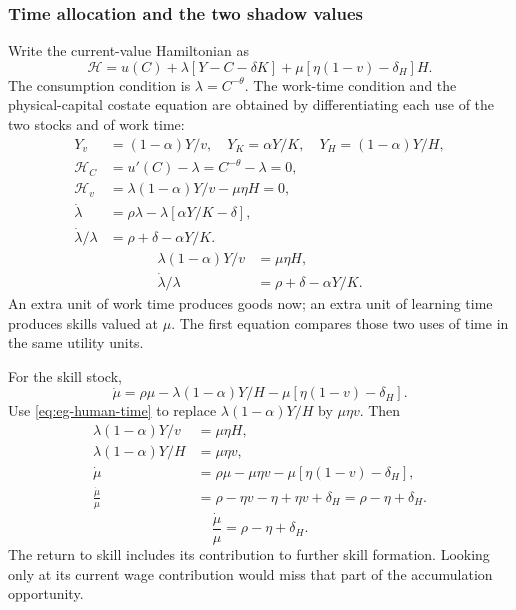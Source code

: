 \subsubsection{Time allocation and the two shadow values}

Write the current-value Hamiltonian as
\begin{equation}
\mathcal H=u(C)+\lambda[Y-C-\delta K]
 +\mu[\eta(1-v)-\delta_H]H.
\end{equation}
The consumption condition is $\lambda=C^{-\theta}$. The work-time condition
and the physical-capital costate equation are
obtained by differentiating each use of the two stocks and of work time:
\begin{align}
Y_v&=(1-\alpha)Y/v,\quad Y_K=\alpha Y/K,\quad
Y_H=(1-\alpha)Y/H,\\
\mathcal H_C&=u'(C)-\lambda=C^{-\theta}-\lambda=0,\\
\mathcal H_v&=\lambda(1-\alpha)Y/v-\mu\eta H=0,\\
\dot\lambda&=\rho\lambda-\lambda[\alpha Y/K-\delta],\\
\dot\lambda/\lambda&=\rho+\delta-\alpha Y/K.
\end{align}
\begin{align}
\lambda(1-\alpha)Y/v&=\mu\eta H,\label{eq:eg-human-time}\\
\dot\lambda/\lambda&=\rho+\delta-\alpha Y/K.
\end{align}
An extra unit of work time produces goods now; an extra unit of learning time
produces skills valued at $\mu$. The first equation compares those two uses
of time in the same utility units.

For the skill stock,
\begin{equation}
\dot\mu=\rho\mu-\lambda(1-\alpha)Y/H
 -\mu[\eta(1-v)-\delta_H].
\end{equation}
Use \eqref{eq:eg-human-time} to replace
$\lambda(1-\alpha)Y/H$ by $\mu\eta v$. Then
\begin{align}
\lambda(1-\alpha)Y/v&=\mu\eta H,\\
\lambda(1-\alpha)Y/H&=\mu\eta v,\\
\dot\mu&=\rho\mu-\mu\eta v-\mu[\eta(1-v)-\delta_H],\\
\frac{\dot\mu}{\mu}
 &=\rho-\eta v-\eta+\eta v+\delta_H
  =\rho-\eta+\delta_H.
\end{align}
\begin{equation}\label{eq:eg-human-costate}
\frac{\dot\mu}{\mu}=\rho-\eta+\delta_H.
\end{equation}
The return to skill includes its contribution to further skill formation.
Looking only at its current wage contribution would miss that part of the
accumulation opportunity.

